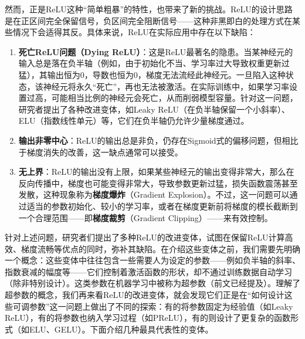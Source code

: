 \documentclass[lang=cn,zihao=-4,a4paper,fontset=windows]{beautybook}
\begin{document}
然而，正是ReLU这种“简单粗暴”的特性，也带来了新的挑战。ReLU的设计思路是在正区间完全保留信号，负区间完全阻断信号——这种非黑即白的处理方式在某些情况下会适得其反。具体来说，ReLU在实际应用中存在以下缺陷：
\begin{enumerate}
\item \textbf{死亡ReLU问题（Dying ReLU）}：这是ReLU最著名的隐患。当某神经元的输入总是落在负半轴（例如，由于初始化不当、学习率过大导致权重更新过猛），其输出恒为0，导数也恒为0，梯度无法流经此神经元。一旦陷入这种状态，该神经元将永久“死亡”，再也无法被激活。在实际训练中，如果学习率设置过高，可能相当比例的神经元会死亡，从而削弱模型容量。针对这一问题，研究者提出了各种改进变体，如Leaky ReLU（在负半轴保留一个小斜率）、ELU（指数线性单元）等，它们在负半轴仍允许少量梯度通过。
\item \textbf{输出非零中心}：ReLU的输出总是非负，仍存在Sigmoid式的偏移问题，但相比于梯度消失的改善，这一缺点通常可以接受。
\item \textbf{无上界}：ReLU的输出没有上限，如果某些神经元的输出变得非常大，那么在反向传播中，梯度也可能变得非常大，导致参数更新过猛，损失函数震荡甚至发散，这种现象称为\textbf{梯度爆炸}（Gradient Explosion）。不过，这一问题可以通过适当的参数初始化、较小的学习率，或者在梯度更新前将梯度的模长截断到一个合理范围——即\textbf{梯度裁剪}（Gradient Clipping）——来有效控制。
\end{enumerate}

针对上述问题，研究者们提出了多种ReLU的改进变体，试图在保留ReLU计算高效、梯度流畅等优点的同时，弥补其缺陷。在介绍这些变体之前，我们需要先明确一个概念：这些变体中往往包含一些需要人为设定的参数——例如负半轴的斜率、指数衰减的幅度等——它们控制着激活函数的形状，却不通过训练数据自动学习（除非特别设计）。这类参数在机器学习中被称为超参数（前文已经提及）。理解了超参数的概念，我们再来看ReLU的改进变体，就会发现它们正是在“如何设计这些可调参数”这一问题上做出了不同的探索：有的将参数固定为经验值（如Leaky ReLU），有的将参数也纳入学习过程（如PReLU），有的则设计了更复杂的函数形式（如ELU、GELU）。下面介绍几种最具代表性的变体。
\end{document}
